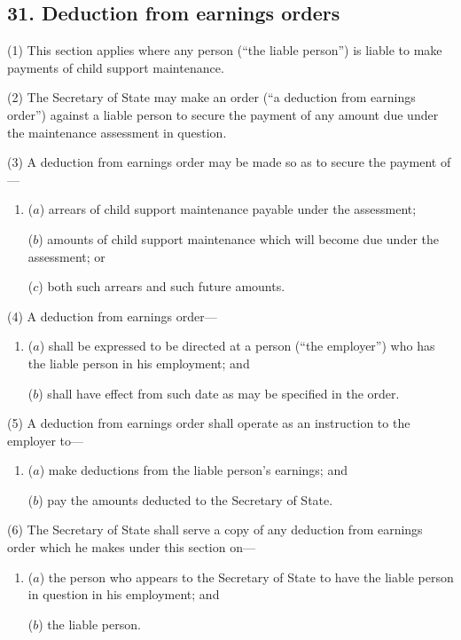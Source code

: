 \documentclass[12pt,a4paper]{article}
\begin{document}

\subsection{31. Deduction from earnings orders}

(1) This section applies where any person (“the liable person”) is liable to make payments of child support maintenance.

(2) The Secretary of State may make an order (“a deduction from earnings order”) against a liable person to secure the payment of any amount due under the maintenance assessment in question.

(3) A deduction from earnings order may be made so as to secure the payment of—
\begin{enumerate}\item[]
($a$) arrears of child support maintenance payable under the assessment;

($b$) amounts of child support maintenance which will become due under the assessment; or

($c$) both such arrears and such future amounts.
\end{enumerate}

(4) A deduction from earnings order—
\begin{enumerate}\item[]
($a$) shall be expressed to be directed at a person (“the employer”) who has the liable person in his employment; and

($b$) shall have effect from such date as may be specified in the order.
\end{enumerate}

(5) A deduction from earnings order shall operate as an instruction to the employer to—
\begin{enumerate}\item[]
($a$) make deductions from the liable person’s earnings; and

($b$) pay the amounts deducted to the Secretary of State.
\end{enumerate}

(6) The Secretary of State shall serve a copy of any deduction from earnings order which he makes under this section on—
\begin{enumerate}\item[]
($a$) the person who appears to the Secretary of State to have the liable person in question in his employment; and

($b$) the liable person.
\end{enumerate}
\end{document}
